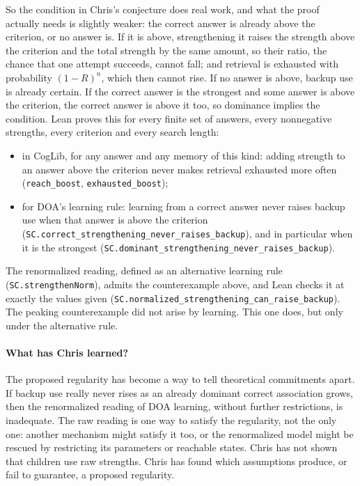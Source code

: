 \documentclass[11pt]{article}
\newcommand{\code}[1]{\texttt{#1}}
\newcommand{\lean}[1]{\texttt{#1}}
\begin{document}
So the condition in Chris's conjecture does real work, and what the proof actually needs is slightly weaker: the correct answer is already above the criterion, or no answer is. If it is above, strengthening it raises the strength above the criterion and the total strength by the same amount, so their ratio, the chance that one attempt succeeds, cannot fall; and retrieval is exhausted with probability $(1-R)^n$, which then cannot rise. If no answer is above, backup use is already certain. If the correct answer is the strongest and some answer is above the criterion, the correct answer is above it too, so dominance implies the condition. Lean proves this for every finite set of answers, every nonnegative strengths, every criterion and every search length:
\begin{itemize}
  \item in CogLib, for any answer and any memory of this kind: adding strength to an answer above the criterion never makes retrieval exhausted more often (\lean{reach\_boost}, \lean{exhausted\_boost});
  \item for DOA's learning rule: learning from a correct answer never raises backup use when that answer is above the criterion (\lean{SC.correct\_strengthening\_never\_raises\_backup}), and in particular when it is the strongest (\lean{SC.dominant\_strengthening\_never\_raises\_backup}).
\end{itemize}
The renormalized reading, defined as an alternative learning rule (\code{SC.strengthenNorm}), admits the counterexample above, and Lean checks it at exactly the values given (\lean{SC.normalized\_strengthening\_can\_raise\_backup}). The peaking counterexample did not arise by learning. This one does, but only under the alternative rule.

\paragraph{What has Chris learned?} The proposed regularity has become a way to tell theoretical commitments apart. If backup use really never rises as an already dominant correct association grows, then the renormalized reading of DOA learning, without further restrictions, is inadequate. The raw reading is one way to satisfy the regularity, not the only one: another mechanism might satisfy it too, or the renormalized model might be rescued by restricting its parameters or reachable states. Chris has not shown that children use raw strengths. Chris has found which assumptions produce, or fail to guarantee, a proposed regularity.
\end{document}
